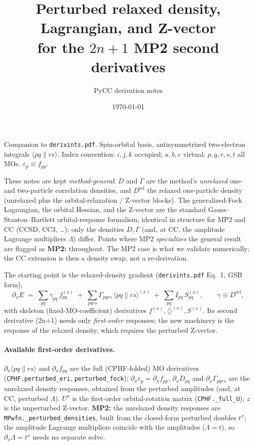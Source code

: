\documentclass[11pt]{article}
\title{Perturbed relaxed density, Lagrangian, and Z-vector\\
       for the $2n{+}1$ MP2 second derivatives}
\author{PyCC derivation notes}
\date{\today}
\newcommand{\pd}[1]{\partial_{#1}}
\newcommand{\aeri}[1]{\langle #1 \rangle}   %
\begin{document}
\maketitle

\noindent
Companion to \texttt{derivints.pdf}. Spin-orbital basis, antisymmetrized two-electron
integrals $\aeri{pq\|rs}$. Index convention: $i,j,k$ occupied; $a,b,c$ virtual;
$p,q,r,s,t$ all MOs. $\varepsilon_p \equiv f_{pp}$.

These notes are kept \emph{method-general}: $D$ and $\Gamma$ are the method's
\emph{unrelaxed} one- and two-particle correlation densities, and $D^{\mathrm{rel}}$ the
relaxed one-particle density (unrelaxed plus the orbital-relaxation / Z-vector blocks). The
generalized-Fock Lagrangian, the orbital Hessian, and the Z-vector are the standard
Gauss--Stanton--Bartlett orbital-response formalism, identical in structure for MP2 and CC
(CCSD, CC3, \dots); only the densities $D,\Gamma$ (and, at CC, the amplitude Lagrange
multipliers $\Lambda$) differ. Points where MP2 \emph{specializes} the general result are
flagged as \textbf{MP2:} throughout. The MP2 case is what we validate numerically; the CC
extension is then a density swap, not a re-derivation.

The starting point is the relaxed-density gradient (\texttt{derivints.pdf} Eq.~1, GSB form),
\begin{equation}
  \pd{x} E \;=\; \sum_{pq}\gamma_{pq}\,f^{(x)}_{pq}
             \;+\; \sum_{pqrs}\Gamma_{pqrs}\,\aeri{pq\|rs}^{(x)}
             \;+\; \sum_{pq}I_{pq}\,S^{(x)}_{pq},
  \qquad \gamma \equiv D^{\mathrm{rel}},
\end{equation}
with skeleton (fixed-MO-coefficient) derivatives $f^{(x)},\aeri{}^{(x)},S^{(x)}$.
Its second derivative (2n+1) needs only \emph{first-order} responses; the new machinery is
the response of the relaxed density, which requires the perturbed Z-vector.

\paragraph{Available first-order derivatives.}
$\pd{x}\aeri{pq\|rs}$ and $\pd{x}f_{pq}$ are the full (CPHF-folded) MO derivatives
(\texttt{CPHF.perturbed\_eri}, \texttt{perturbed\_fock}); $\pd{x}\varepsilon_p=\pd{x}f_{pp}$.
$\pd{x}D_{pq}$ and $\pd{x}\Gamma_{pqrs}$ are the unrelaxed density responses, obtained from
the perturbed amplitudes (and, at CC, perturbed $\Lambda$). $U^x$ is the first-order
orbital-rotation matrix (\texttt{CPHF.\_full\_U}); $z$ is the unperturbed Z-vector.
\textbf{MP2:} the unrelaxed density responses are \texttt{MPwfn.\_perturbed\_densities},
built from the closed-form perturbed doubles $t^x$; the amplitude Lagrange multipliers
coincide with the amplitudes ($\Lambda=t$), so $\pd{x}\Lambda=t^x$ needs no separate solve.
\end{document}
